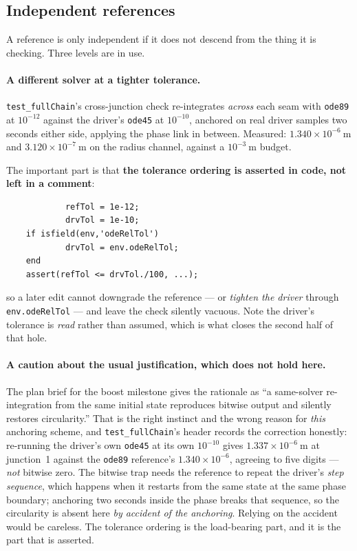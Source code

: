 \documentclass[11pt]{article}
\newcommand{\code}[1]{\texttt{#1}}
\begin{document}
\subsection{Independent references}

A reference is only independent if it does not descend from the thing it is
checking. Three levels are in use.

\paragraph{A different solver at a tighter tolerance.}
\code{test\_fullChain}'s cross-junction check re-integrates \emph{across} each
seam with \code{ode89} at $10^{-12}$ against the driver's \code{ode45} at
$10^{-10}$, anchored on real driver samples two seconds either side, applying
the phase link in between. Measured: $1.340\times10^{-6}~\mathrm{m}$ and
$3.120\times10^{-7}~\mathrm{m}$ on the radius channel, against a
$10^{-3}~\mathrm{m}$ budget.

The important part is that \textbf{the tolerance ordering is asserted in code,
not left in a comment}:

\begin{lstlisting}
            refTol = 1e-12;
            drvTol = 1e-10;
    if isfield(env,'odeRelTol')
            drvTol = env.odeRelTol;
    end
    assert(refTol <= drvTol./100, ...);
\end{lstlisting}

so a later edit cannot downgrade the reference --- or \emph{tighten the driver}
through \code{env.odeRelTol} --- and leave the check silently vacuous. Note the
driver's tolerance is \emph{read} rather than assumed, which is what closes the
second half of that hole.

\paragraph{A caution about the usual justification, which does not hold here.}
The plan brief for the boost milestone gives the rationale as ``a same-solver
re-integration from the same initial state reproduces bitwise output and
silently restores circularity.'' That is the right instinct and the wrong
reason for \emph{this} anchoring scheme, and \code{test\_fullChain}'s header
records the correction honestly: re-running the driver's own \code{ode45} at
its own $10^{-10}$ gives $1.337\times10^{-6}~\mathrm{m}$ at junction~1 against
the \code{ode89} reference's $1.340\times10^{-6}$, agreeing to five digits ---
\emph{not} bitwise zero. The bitwise trap needs the reference to repeat the
driver's \emph{step sequence}, which happens when it restarts from the same
state at the same phase boundary; anchoring two seconds inside the phase breaks
that sequence, so the circularity is absent here \emph{by accident of the
anchoring}. Relying on the accident would be careless. The tolerance ordering
is the load-bearing part, and it is the part that is asserted.
\end{document}
